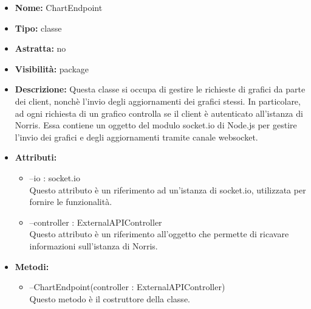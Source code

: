 	
			
			\begin{itemize}
			\item \textbf{Nome:} ChartEndpoint
			\item \textbf{Tipo:} classe
			
		\item \textbf{Astratta:}
		no
			\item \textbf{Visibilità:} package
			\item \textbf{Descrizione:} Questa classe si occupa di gestire le richieste di  grafici da parte dei client, nonchè l'invio degli aggiornamenti dei grafici stessi. In particolare, ad ogni richiesta di un grafico controlla se il client è autenticato all'istanza di Norris. Essa contiene un oggetto del modulo socket.io di Node.js per gestire l'invio dei grafici e degli aggiornamenti tramite canale websocket.
			\item \textbf{Attributi:}
				\begin{itemize}
				\setlength{\itemsep}{5pt}
				
					\item[\ding{111}] {--io : socket.io} \\ [1mm] Questo attributo è un riferimento ad un'istanza di socket.io, utilizzata per fornire le funzionalità.
					\item[\ding{111}] {--controller : ExternalAPIController} \\ [1mm] Questo attributo è un riferimento all'oggetto che permette di ricavare informazioni sull'istanza di Norris.
				\end{itemize}
		
			\item \textbf{Metodi:}
				\begin{itemize}
				\setlength{\itemsep}{5pt}
				
					\item[\ding{111}] {{--ChartEndpoint(controller : ExternalAPIController)}} \\ [1mm] Questo metodo è il costruttore della classe.
				\end{itemize}
		
			\end{itemize}

